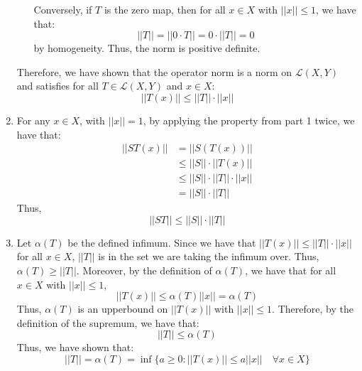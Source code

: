\documentclass[12pt]{article}
\begin{document}
\begin{solution}
\begin{enumerate}
\begin{enumerate}
            Conversely, if $T$ is the zero map, then for all $x \in X$ with $||x|| \leq 1$, we have that:
            \[ ||T|| = ||0 \cdot T|| = 0 \cdot ||T|| = 0\]
            by homogeneity. Thus, the norm is positive definite.
        \end{enumerate}
        Therefore, we have shown that the operator norm is a norm on $\mathcal{L}(X, Y)$ and satisfies for all $T \in \mathcal{L}(X, Y)$ and $x \in X$:
        \[ ||T(x)|| \leq ||T|| \cdot ||x||\]
        \item For any $x \in X$, with $||x|| = 1$, by applying the property from part 1 twice, we have that: 
        \begin{align*}
            ||ST(x)|| &= ||S(T(x))|| \\
            &\leq ||S|| \cdot ||T(x)|| \\
            &\leq ||S|| \cdot ||T|| \cdot ||x|| \\
            &= ||S|| \cdot ||T||
        \end{align*}
        Thus,
        \[ ||ST|| \leq ||S|| \cdot ||T||\]
        \item Let $\alpha(T)$ be the defined infimum. \bbni
        Since we have that $||T(x)|| \leq ||T||\cdot ||x||$ for all $x \in X$, $||T||$ is in the set we are taking the infimum over. Thus, $\alpha(T) \geq ||T||$. \bbni
        Moreover, by the definition of $\alpha(T)$, we have that for all $x \in X$ with $||x|| \leq 1$,
        \[ ||T(x)|| \leq \alpha(T)||x|| = \alpha(T) \]
        Thus, $\alpha(T)$ is an upperbound on $||T(x)||$ with $||x|| \leq 1$. Therefore, by the definition of the supremum, we have that:
        \[ ||T|| \leq \alpha(T)\]
        Thus, we have shown that:
        \[ ||T|| = \alpha(T) = \inf\{ a \geq 0 : ||T(x)|| \leq a||x|| \quad \forall x \in X\}\]


    \end{enumerate}
\end{solution}
\newpage 
\end{document}
